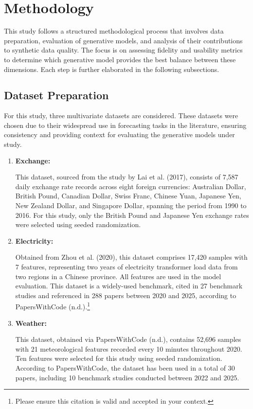 \documentclass{article}
\begin{document}
\section{Methodology}
This study follows a structured methodological process that involves data preparation, evaluation of generative models, and analysis of their contributions to synthetic data quality. The focus is on assessing fidelity and usability metrics to determine which generative model provides the best balance between these dimensions. Each step is further elaborated in the following subsections.

\subsection{Dataset Preparation}
For this study, three multivariate datasets are considered. These datasets were chosen due to their widespread use in forecasting tasks in the literature, ensuring consistency and providing context for evaluating the generative models under study.

\begin{enumerate}
    \item \textbf{Exchange:} 
    
    This dataset, sourced from the study by Lai et al. (2017), consists of 7,587 daily exchange rate records across eight foreign currencies: Australian Dollar, British Pound, Canadian Dollar, Swiss Franc, Chinese Yuan, Japanese Yen, New Zealand Dollar, and Singapore Dollar, spanning the period from 1990 to 2016. For this study, only the British Pound and Japanese Yen exchange rates were selected using seeded randomization.

    \item \textbf{Electricity:} 
    
    Obtained from Zhou et al. (2020), this dataset comprises 17,420 samples with 7 features, representing two years of electricity transformer load data from two regions in a Chinese province. All features are used in the model evaluation. This dataset is a widely-used benchmark, cited in 27 benchmark studies and referenced in 288 papers between 2020 and 2025, according to PapersWithCode (n.d.).\footnote{Please ensure this citation is valid and accepted in your context.}

    
    \item \textbf{Weather:} 

    This dataset, obtained via PapersWithCode (n.d.), contains 52,696 samples with 21 meteorological features recorded every 10 minutes throughout 2020. Ten features were selected for this study using seeded randomization. According to PapersWithCode, the dataset has been used in a total of 30 papers, including 10 benchmark studies conducted between 2022 and 2025.



\end{enumerate}
\end{document}
